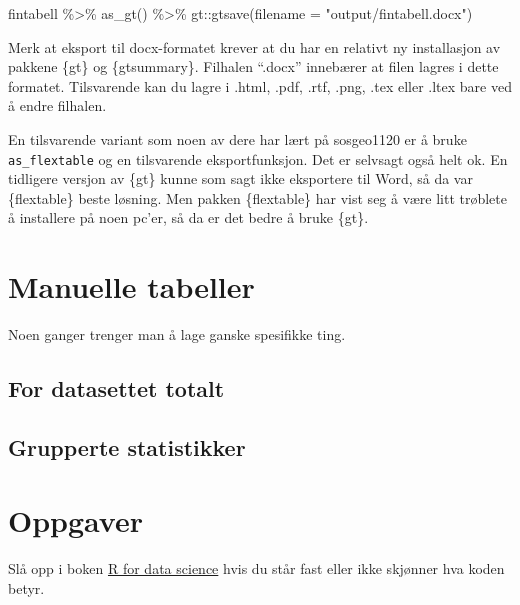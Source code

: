 \documentclass[
  norsk,
  letterpaper,
  DIV=11,
  numbers=noendperiod]{scrreprt}
\newenvironment{Shaded}{\begin{snugshade}}{\end{snugshade}}
\newcommand{\AttributeTok}[1]{\textcolor[rgb]{0.40,0.45,0.13}{#1}}
\newcommand{\FunctionTok}[1]{\textcolor[rgb]{0.28,0.35,0.67}{#1}}
\newcommand{\NormalTok}[1]{\textcolor[rgb]{0.00,0.23,0.31}{#1}}
\newcommand{\SpecialCharTok}[1]{\textcolor[rgb]{0.37,0.37,0.37}{#1}}
\newcommand{\StringTok}[1]{\textcolor[rgb]{0.13,0.47,0.30}{#1}}
\theoremstyle{definition}
\theoremstyle{remark}
\begin{document}
\begin{Shaded}
\begin{Highlighting}[]
\NormalTok{fintabell }\SpecialCharTok{\%\textgreater{}\%} 
  \FunctionTok{as\_gt}\NormalTok{() }\SpecialCharTok{\%\textgreater{}\%} 
\NormalTok{  gt}\SpecialCharTok{::}\FunctionTok{gtsave}\NormalTok{(}\AttributeTok{filename =} \StringTok{"output/fintabell.docx"}\NormalTok{)}
\end{Highlighting}
\end{Shaded}

Merk at eksport til docx-formatet krever at du har en relativt ny
installasjon av pakkene \{gt\} og \{gtsummary\}. Filhalen ``.docx''
innebærer at filen lagres i dette formatet. Tilsvarende kan du lagre i
.html, .pdf, .rtf, .png, .tex eller .ltex bare ved å endre filhalen.

En tilsvarende variant som noen av dere har lært på sosgeo1120 er å
bruke \texttt{as\_flextable} og en tilsvarende eksportfunksjon. Det er
selvsagt også helt ok. En tidligere versjon av \{gt\} kunne som sagt
ikke eksportere til Word, så da var \{flextable\} beste løsning. Men
pakken \{flextable\} har vist seg å være litt trøblete å installere på
noen pc'er, så da er det bedre å bruke \{gt\}.

\section{Manuelle tabeller}\label{manuelle-tabeller}

Noen ganger trenger man å lage ganske spesifikke ting.

\subsection{For datasettet totalt}\label{for-datasettet-totalt}

\subsection{Grupperte statistikker}\label{grupperte-statistikker}

\section{Oppgaver}\label{oppgaver-2}

Slå opp i boken \href{https://r4ds.had.co.nz/data-visualisation.html}{R
for data science} hvis du står fast eller ikke skjønner hva koden betyr.
\end{document}
